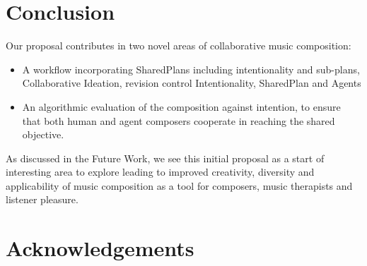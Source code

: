 \documentclass[final,authoryear,5p,times,twocolumn]{elsarticle}
\begin{document}
\begin{itemize}
\end{itemize}

\section*{Conclusion}
  
Our proposal contributes in two novel areas of collaborative music composition:
\begin{itemize}
	\item A workflow incorporating SharedPlans including intentionality and sub-plans, Collaborative Ideation, revision control Intentionality, SharedPlan and Agents
	\item An algorithmic evaluation of the composition against intention, to ensure that both human and agent composers cooperate in reaching the shared objective.
\end{itemize}

As discussed in the Future Work, we see this initial proposal as a start of interesting area to explore leading to improved creativity, diversity and applicability of music composition as a tool for composers, music therapists and listener pleasure.

 
 
\section*{Acknowledgements}
\end{document}
